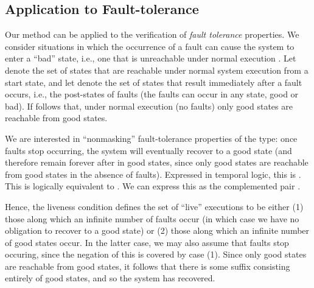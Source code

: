 \documentclass[11pt]{article}
\begin{document}

\subsection{Application to Fault-tolerance}
\label{sec:fault-tolerance}

Our method can be applied to the verification of \emph{fault
tolerance} properties. We consider situations in which the occurrence
of a fault can cause the system to enter a ``bad'' state, i.e., one
that is unreachable under normal execution \cite{AAE98}.
Let  denote the set of states that are reachable under normal system
execution from a start state, and
let  denote the set of states that result immediately
after a fault occurs, i.e., the post-states of faults (the faults can
occur in any state, good or bad). 
If follows that, under normal execution (no faults) only good states
are reachable from good states.


We are interested in ``nonmasking'' fault-tolerance properties of the type: once
faults stop occurring, the system will eventually recover to a good state (and
therefore remain forever after in good states, since only good states
are reachable from good states in the absence of faults). 
Expressed in temporal logic, this is .
This is logically equivalent to . We can
express this as the complemented pair .


Hence, the liveness condition  defines
the set of ``live'' executions to be either 
(1) those along which an
infinite number of faults occur (in which case we have no obligation
to recover to a good state) or 
(2) those along which an infinite number of good
states occur. In the latter case, we may also assume that faults stop
occuring, since the negation of this is covered by case (1).
Since only good states are reachable from good states, it follows that
there is some suffix consisting entirely of good states, and so the
system has recovered.
\end{document}
